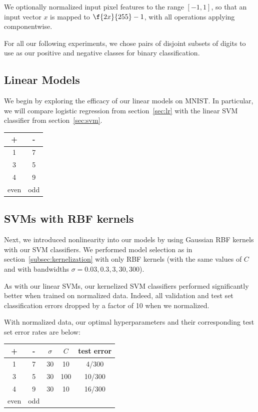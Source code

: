 \documentclass{article}
\begin{document}
\begin{multicols}{2}
We optionally normalized input pixel features to the range $[-1, 1]$,
so that an input vector $x$ is mapped to $\f{2x}{255}-1$,
with all operations applying componentwise.

For all our following experiments,
we chose pairs of disjoint subsets of digits
to use as our positive and negative classes for binary classification.

\subsection{Linear Models}

We begin by exploring the efficacy of our linear models on MNIST.
In particular, we will compare logistic regression from section~\ref{sec:lr}
with the linear SVM classifier from section~\ref{sec:svm}.


\begin{center}
\begin{tabular}{|c|c|}
\hline
+ & - \\\hline
1 & 7 \\
3 & 5 \\
4 & 9 \\
even & odd \\\hline
\end{tabular}
\end{center}



\subsection{SVMs with RBF kernels}

Next, we introduced nonlinearity into our models
by using Gaussian RBF kernels with our SVM classifiers.
We performed model selection as in section~\ref{subsec:kernelization}
with only RBF kernels
(with the same values of $C$ and with bandwidths $\sigma = 0.03,0.3,3,30, 300$).

As with our linear SVMs,
our kernelized SVM classifiers performed significantly better
when trained on normalized data.
Indeed, all validation and test set classification errors dropped by a factor of 10
when we normalized.

With normalized data, our optimal hyperparameters
and their corresponding test set error rates are below:
\begin{center}
\begin{tabular}{|c|c|c|c|c|}
\hline
+ & - & $\sigma$ & $C$ & test error \\\hline
1 & 7 & 30 & 10 & 4/300 \\
3 & 5 & 30 & 100 & 10/300\\
4 & 9 & 30 & 10 & 16/300\\
even & odd \\\hline
\end{tabular}
\end{center}



\end{multicols}
\end{document}
